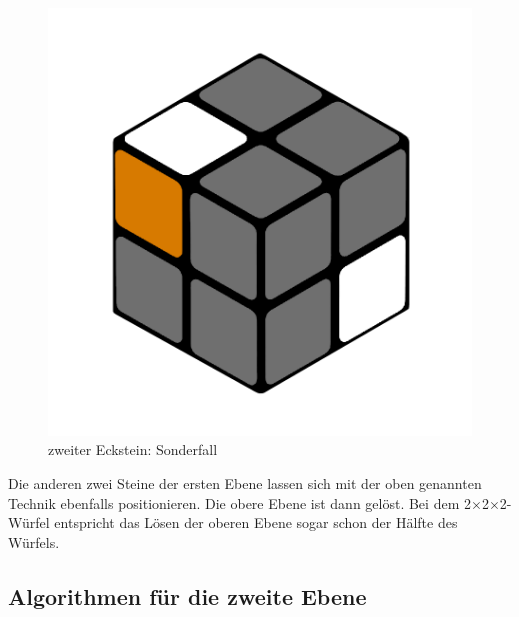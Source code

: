 \documentclass[12pt,a4paper, usenames, dvipsnames]{article}
\newcommand{\Ttwo}{2$\times$2$\times$2-}
\begin{document}
\begin{figure}[h]
\includegraphics[scale=0.1]{e1_s2_s4_s.png}
\caption{zweiter Eckstein: Sonderfall}
\label{32}
\end{figure}

Die anderen zwei Steine der ersten Ebene lassen sich mit der oben genannten Technik ebenfalls positionieren. Die obere Ebene ist dann gelöst.
Bei dem \Ttwo Würfel entspricht das Lösen der oberen Ebene sogar schon der Hälfte des Würfels.



%
%
%
%
%
%
%
%
%
%
%
%
%
%
%
%
%
%
%
\subsection*{Algorithmen für die zweite Ebene}
\end{document}
